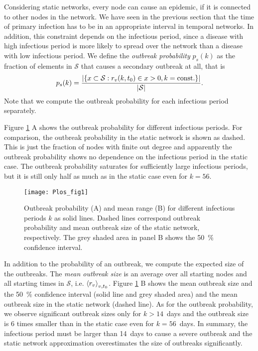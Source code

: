 Considering static networks, every node can cause an epidemic, if it is connected to other nodes in the network.
We have seen in the previous section that the time of primary infection has to be in an appropriate interval in temporal networks.
In addition, this constraint depends on the infectious period, since a disease with high infectious period is more likely to spread over the network than a disease with low infectious period.
We define the \emph{outbreak probability} $p_s(k)$ as the fraction of elements in $\mathcal{S}$ that causes a secondary outbreak at all, that is
\begin{equation}\label{eq:outbreak_prob}
p_s(k)=\frac{\left| \left\{ x \subset \mathcal{S}: r_v(k,t_0) \in x >0, k=\mathrm{const.} \right\} \right|}{\left| \mathcal{S} \right|} .
\end{equation}
Note that we compute the outbreak probability for each infectious period separately.

Figure \ref{fig:plosfig1} A shows the outbreak probability for different infectious periods.
For comparison, the outbreak probability in the static network is shown as dashed.
This is just the fraction of nodes with finite out degree and apparently the outbreak probability shows no dependence on the infectious period in the static case.
The outbreak probability saturates for sufficiently large infectious periods, but it is still only half as much as in the static case even for $k=56$.
%
\begin{figure}[htbp]
\begin{center}
\texttt{[image: Plos\_fig1]}
\caption{Outbreak probability (A) and mean range (B) for different infectious periods $k$ as solid lines.
Dashed lines correspond outbreak probability and mean outbreak size of the static network, respectively.
The grey shaded area in panel B shows the 50~\% confidence interval.}
\label{fig:plosfig1}
\end{center}
\end{figure}

In addition to the probability of an outbreak, we compute the expected size of the outbreaks.
The \emph{mean outbreak size} is an average over all starting nodes and all starting times in $\mathcal{S}$, i.e. $\left< r_v \right>_{v,t_0}$.
Figure \ref{fig:plosfig1} B shows the mean outbreak size and the 50~\% confidence interval (solid line and grey shaded area) and the mean outbreak size in the static network (dashed line).
As for the outbreak probability, we observe significant outbreak sizes only for $k>14$~days and the outbreak size is 6 times smaller than in the static case even for $k=56$~days.
In summary, the infectious period must be larger than 14~days to cause a severe outbreak and the static network approximation overestimates the size of outbreaks significantly.

